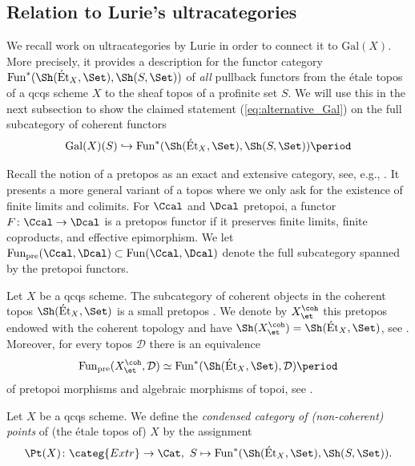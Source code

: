 \documentclass[leqno]{article}
\renewcommand{\Fun}{\mathrm{Fun}}
\renewcommand{\Gal}{\mathrm{Gal}}
\newcommand{\Extr}{\categ{Extr}}
\newcommand{\Et}[1]{\mathrm{\acute{E}t}_{#1}}
\begin{document}
\subsection{Relation to Lurie's ultracategories}
We recall work on ultracategories by Lurie \cite{Ultracategories} in order to connect it to $\Gal(X)$. More precisely, it provides a description for the functor category $\Fun^*(\Sh(\Et{X},\Set),\Sh(S,\Set))$ of \textit{all} pullback functors from the \'etale topos of a qcqs scheme $X$ to the sheaf topos of a profinite set $S$. We will use this in the next subsection to show the claimed statement (\ref{eq:alternative_Gal}) on the full subcategory  of coherent functors $$\Gal(X)(S)\hookrightarrow\Fun^*(\Sh(\Et{X}, \Set),\Sh(S,\Set))\period $$
%
\begin{recollection}
Recall the notion of a pretopos as an exact and extensive category, see, e.g., \cite[Definition A.4.1]{Ultracategories}.
It presents a more general variant of a topos where we only ask for the existence of finite limits and colimits.
For $\Ccal$ and $\Dcal$ pretopoi, a functor $F \colon \Ccal \rightarrow \Dcal$ is a pretopos functor if it preserves finite limits, finite coproducts, and effective epimorphism.
We let $\Fun_{\mathrm{pre}}(\Ccal,\Dcal)\subset \Fun(\Ccal, \Dcal)$ denote the full subcategory spanned by the pretopoi functors.
\end{recollection}
%
\begin{recollection}
Let $X$ be a qcqs scheme.
The subcategory of coherent objects in the coherent topos $\Sh(\Et{X}, \Set)$ is a small pretopos \cite[Corollary C.5.14]{Ultracategories}. We denote by $X_{\et}^{\coh}$ this pretopos endowed with the coherent topology and have $\Sh(X_{\et}^{\coh})=\Sh(\Et{X}, \Set)$, see \cite[Proposition C.6.4, Theorem C.6.5]{Ultracategories}.
Moreover, for every topos $\mathcal{D}$ there is an equivalence 
\begin{align}\label{eq:pre_topoi_morphisms}
\Fun_{\mathrm{pre}}(X_{\et}^{\coh}, \mathcal{D})\simeq \Fun^{*}(\Sh(\Et{X},\Set),\mathcal{D})\period
 \end{align}
of pretopoi morphisms and algebraic morphisms of topoi, see \cite[Corollary C.3.6]{Ultracategories}.
\end{recollection}
%
\begin{definition}
Let $X$ be a qcqs scheme. We define the \textit{condensed category of (non-coherent) points} of (the \'etale topos of) $X$ by the assignment 
$$\Pt(X)\colon \Extr \rightarrow \Cat, \  S \mapsto \Fun^*(\Sh(\Et{X},\Set),\Sh(S,\Set)).$$   
\end{definition}
\end{document}
